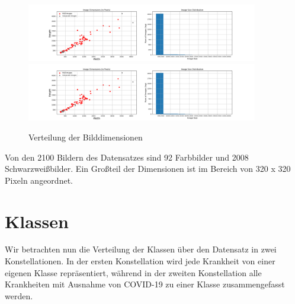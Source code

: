 \begin{figure}[H]
	\centering
	\includegraphics[trim=110px 0 0.5\imagewidth{} 0, clip,width=0.9\textwidth]{../results/image_sizes.png}
	\includegraphics[trim=0.5\imagewidth{} 0 110px 0, clip,width=0.9\textwidth]{../results/image_sizes.png}
	\caption{Verteilung der Bilddimensionen}
\end{figure}

Von den 2100 Bildern des Datensatzes sind 92 Farbbilder und 2008 Schwarzweißbilder. Ein Großteil der Dimensionen ist im Bereich von 320 x 320 Pixeln angeordnet.

\section{Klassen}

Wir betrachten nun die Verteilung der Klassen über den Datensatz in zwei Konstellationen. In der ersten Konstellation wird jede Krankheit von einer eigenen Klasse repräsentiert, während in der zweiten Konstellation alle Krankheiten mit Ausnahme von COVID-19 zu einer Klasse zusammengefasst werden.

